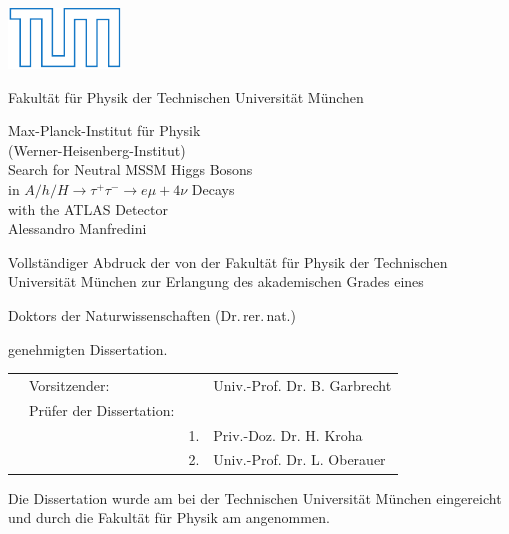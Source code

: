 \thispagestyle{empty}
  \begin{center}
        \includegraphics[height=1.cm]{logos/TUMLogo_oZ_Outline_blau_CMYK.pdf}      


        \Large Fakult\"at f\"ur Physik der Technischen Universit\"at M\"unchen \\       
        \vspace*{3ex}

        \Large Max-Planck-Institut f\"{u}r Physik \\       
        \Large (Werner-Heisenberg-Institut) \\[3ex]

        {\LARGE Search for Neutral MSSM Higgs Bosons \\in $A/h/H \rightarrow \tau^+ \tau^- \rightarrow e\mu + 4\nu$ Decays\\with the ATLAS Detector}\\[5ex] 

  	\Large Alessandro Manfredini\\[8ex]

  \end{center}


Vollst\"{a}ndiger Abdruck der von der Fakult\"{a}t f\"{u}r Physik
der Technischen Universit\"{a}t M\"{u}nchen zur Erlangung des akademischen Grades eines\vspace{-0.5cm}
\begin{center}
Doktors der Naturwissenschaften (Dr.\,rer.\,nat.)\vspace{-0.5cm}%
\end{center}
genehmigten Dissertation.\\[4ex]

\begin{tabular}{clll}
   &Vorsitzender:            &    & Univ.-Prof. Dr. B. Garbrecht \\
   &Pr\"{u}fer der Dissertation:  && \\
   &                         & 1. & Priv.-Doz. Dr. H. Kroha \\
   &                         & 2. & Univ.-Prof. Dr. L. Oberauer   \\[3ex]
\end{tabular}


\begin{flushleft}
  Die Dissertation wurde am \submissiondate{} bei der Technischen
  Universit\"{a}t M\"{u}nchen eingereicht und durch die Fakult\"{a}t
  f\"{u}r Physik am \confirmationdate{} angenommen.
\end{flushleft}
\restoregeometry
\clearemptydoublepage


